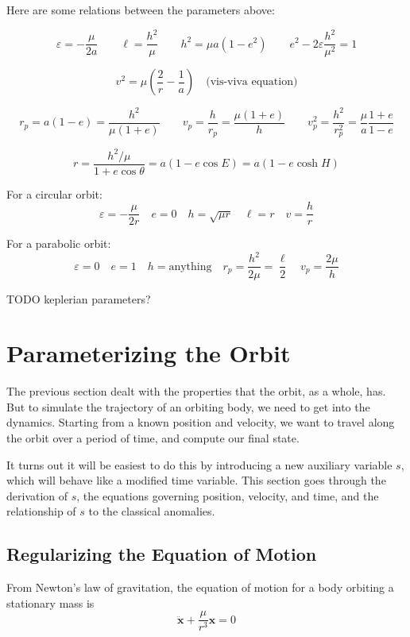 \documentclass{article}
\numberwithin{equation}{subsection}
\begin{document}
Here are some relations between the parameters above:

\[ \varepsilon = -\frac{\mu}{2a} \qquad \ell = \frac{h^2}{\mu} \qquad h^2 = \mu a(1 - e^2) \qquad e^2 - 2 \varepsilon \frac{h^2}{\mu^2} = 1 \]

\[ v^2 = \mu \left( \frac{2}{r} - \frac{1}{a} \right) \quad \textrm{(vis-viva equation)} \]

\[  r_p = a(1 - e) = \frac{h^2}{\mu (1 + e)} \qquad v_p = \frac{h}{r_p} = \frac{\mu(1+e)}{h} \qquad v_p^2 = \frac{h^2}{r_p^2} = \frac{\mu}{a} \frac{1+e}{1-e} \]

\[ r = \frac{h^2/\mu}{1 + e \cos \theta} = a (1 - e \cos E) = a (1 - e \cosh H) \]

For a circular orbit:
\[ \varepsilon = -\frac{\mu}{2r} \quad e = 0 \quad h = \sqrt{\mu r} \quad \ell = r \quad v = \frac{h}{r} \]

For a parabolic orbit:
\[ \varepsilon = 0 \quad e = 1 \quad h = \textrm{anything} \quad r_p = \frac{h^2}{2\mu} = \frac{\ell}{2} \quad v_p = \frac{2\mu}{h} \]

TODO keplerian parameters?

\section{Parameterizing the Orbit}

The previous section dealt with the properties that the orbit, as a whole, has. But to simulate the trajectory of an orbiting body, we need to get into the dynamics. Starting from a known position and velocity, we want to travel along the orbit over a period of time, and compute our final state.

It turns out it will be easiest to do this by introducing a new auxiliary variable $s$, which will behave like a modified time variable. This section goes through the derivation of $s$, the equations governing position, velocity, and time, and the relationship of $s$ to the classical anomalies.


\subsection{Regularizing the Equation of Motion}

From Newton's law of gravitation, the equation of motion for a body orbiting a stationary mass is
\begin{equation}
\label{eq-of-motion-t}
\ddot{\bm x} + \frac{\mu}{r^3} \bm x = 0
\end{equation}
\end{document}
